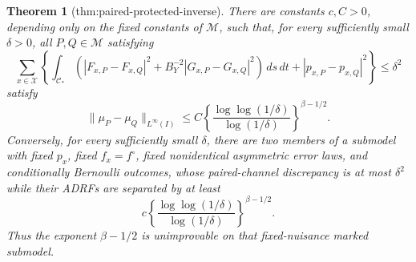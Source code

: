 \documentclass{article}
\newtheorem{theorem}{Theorem}
\begin{document}
\begin{theorem}[thm:paired-protected-inverse]\label{thm:paired-protected-inverse}
There are constants \(c,C>0\), depending only on the fixed constants of \(\mathcal M\), such that, for every sufficiently small \(\delta>0\), all \(P,Q\in\mathcal M\) satisfying
\[
 \sum_{x\in\mathcal X}\left\{\int_{\mathcal C_*}\left(
 |F_{x,P}-F_{x,Q}|^2+B_Y^{-2}|G_{x,P}-G_{x,Q}|^2\right)\,ds\,dt
 +|p_{x,P}-p_{x,Q}|^2\right\}\le\delta^2
\]
satisfy
\[
 \|\mu_P-\mu_Q\|_{L^\infty(I)}
 \le C\left\{\frac{\log\log(1/\delta)}{\log(1/\delta)}\right\}^{\beta-1/2}.
\]
Conversely, for every sufficiently small \(\delta\), there are two members of a submodel with fixed \(p_x\), fixed \(f_x=f^\circ\), fixed nonidentical asymmetric error laws, and conditionally Bernoulli outcomes, whose paired-channel discrepancy is at most \(\delta^2\) while their ADRFs are separated by at least
\[
 c\left\{\frac{\log\log(1/\delta)}{\log(1/\delta)}\right\}^{\beta-1/2}.
\]
Thus the exponent \(\beta-1/2\) is unimprovable on that fixed-nuisance marked submodel.
\end{theorem}
\end{document}

